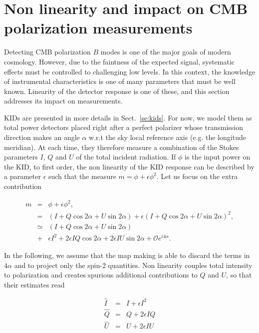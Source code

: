 
\section{Non linearity and impact on CMB polarization measurements}
\label{sec:cmb}

Detecting CMB polarization $B$ modes is one of the major goals of modern
cosmology. However, due to the faintness of the expected signal, systematic
effects must be controlled to challenging low levels. In this context, the
knowledge of instrumental characteristics is one of many parameters that must be
well known. Linearity of the detector response is one of these,
and this section addresses its impact on measurements.

KIDs are presented in more details in Sect.~\ref{se:kids}. For now, we model
them as total power detectors placed right after a perfect polarizer whose
transmission direction makes an angle $\alpha$ w.r.t the sky local reference
axis (e.g. the longitude meridian). At each time, they therefore measure a
combination of the Stokes parameters $I$, $Q$ and $U$ of the total incident
radiation. If $\phi$ is the input power on the KID, to first order, the non
linearity of the KID response can be described by a parameter $\epsilon$ such
that the measure $m=\phi + \epsilon\phi^2$. Let us focus on the
extra contribution

\begin{eqnarray}
m &=& \phi + \epsilon\phi^2, \nonumber \\
&=& (I+Q\cos2\alpha+U\sin2\alpha) + \epsilon(I+Q\cos2\alpha+U\sin2\alpha)^2, \nonumber\\
 &\simeq & (I+Q\cos2\alpha+U\sin2\alpha) \nonumber \\
&+&\epsilon I^{2} + 2\epsilon IQ\cos2\alpha + 
2\epsilon IU \sin2\alpha + \mathcal{O}e^{i4\alpha}.
\label{eq:eq-NL}
\end{eqnarray}

In the following, we assume that the map making is able to discard the terms in
$4\alpha$ and to project only the spin-2 quantities. Non linearity couples total
intensity to polarization and creates spurious additional contributions to $Q$
and $U$, so that their estimates read

\begin{eqnarray}
\hat{I} &=& I + \epsilon I^2\\
\hat{Q} &=& Q + 2\epsilon IQ\\
\hat{U} &=& U + 2\epsilon IU
\end{eqnarray}

